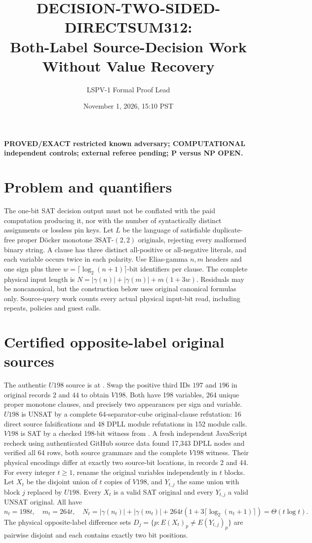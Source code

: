 \documentclass[11pt]{article}
\title{DECISION-TWO-SIDED-DIRECTSUM312:\\ Both-Label Source-Decision Work Without Value Recovery}
\author{LSPV-1 Formal Proof Lead}
\date{November 1, 2026, 15:10 PST}
\begin{document}
\maketitle
\noindent\textbf{PROVED/EXACT restricted known adversary; COMPUTATIONAL independent controls; external referee pending; P versus NP OPEN.}
\section{Problem and quantifiers}
The one-bit SAT decision output must not be conflated with the paid computation producing it, nor with the number of syntactically distinct assignments or lossless pin keys. Let $L$ be the language of satisfiable duplicate-free proper D\"ocker monotone $3$SAT-$(2,2)$ originals, rejecting every malformed binary string. A clause has three distinct all-positive or all-negative literals, and each variable occurs twice in each polarity. Use Elias-gamma $n,m$ headers and one sign plus three $w=\lceil\log_2(n+1)\rceil$-bit identifiers per clause. The complete physical input length is $N=|\gamma(n)|+|\gamma(m)|+m(1+3w)$. Residuals may be noncanonical, but the construction below uses original canonical formulas only. Source-query work counts every actual physical input-bit read, including repeats, policies and guest calls.
\section{Certified opposite-label original sources}
The authentic $U198$ source is at . Swap the positive third IDs $197$ and $196$ in original records $2$ and $44$ to obtain $V198$. Both have 198 variables, 264 unique proper monotone clauses, and precisely two appearances per sign and variable. $U198$ is UNSAT by a complete 64-separator-cube original-clause refutation: 16 direct source falsifications and 48 DPLL module refutations in 152 module calls. $V198$ is SAT by a checked 198-bit witness from . A fresh independent JavaScript recheck using authenticated GitHub source data found 17,343 DPLL nodes and verified all 64 rows, both source grammars and the complete $V198$ witness. Their physical encodings differ at exactly two source-bit locations, in records 2 and 44.
For every integer $t\ge1$, rename the original variables independently in $t$ blocks. Let $X_t$ be the disjoint union of $t$ copies of $V198$, and $Y_{t,j}$ the same union with block $j$ replaced by $U198$. Every $X_t$ is a valid SAT original and every $Y_{t,j}$ a valid UNSAT original. All have
\[
n_t=198t,\quad m_t=264t,\quad
N_t=|\gamma(n_t)|+|\gamma(m_t)|+264t(1+3\lceil\log_2(n_t+1)\rceil)=\Theta(t\log t).
\]
The physical opposite-label difference sets $D_j=\{p:E(X_t)_p\ne E(Y_{t,j})_p\}$ are pairwise disjoint and each contains exactly two bit positions.
\end{document}
